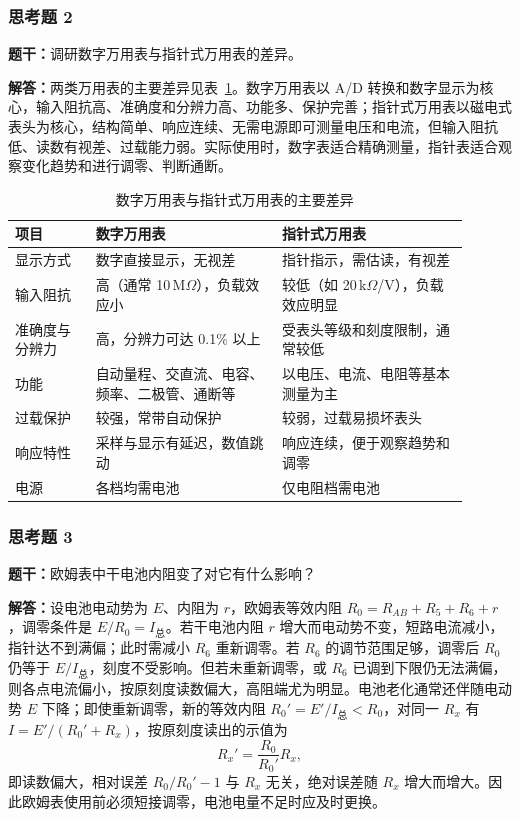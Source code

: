 \documentclass{Phyport}
\begin{document}
\subsubsection{思考题 2}
\textbf{题干：}调研数字万用表与指针式万用表的差异。

\textbf{解答：}两类万用表的主要差异见表~\ref{tab:dmm}。数字万用表以 A/D 转换和数字显示为核心，输入阻抗高、准确度和分辨力高、功能多、保护完善；指针式万用表以磁电式表头为核心，结构简单、响应连续、无需电源即可测量电压和电流，但输入阻抗低、读数有视差、过载能力弱。实际使用时，数字表适合精确测量，指针表适合观察变化趋势和进行调零、判断通断。

\begin{table}[H]
    \centering
    \caption{数字万用表与指针式万用表的主要差异}
    \label{tab:dmm}
    \small
    \begin{tabular}{p{0.16\linewidth}p{0.37\linewidth}p{0.37\linewidth}}
        \toprule
        项目 & 数字万用表 & 指针式万用表 \\
        \midrule
        显示方式 & 数字直接显示，无视差 & 指针指示，需估读，有视差 \\
        输入阻抗 & 高（通常 10\,M$\Omega$），负载效应小 & 较低（如 20\,k$\Omega$/V），负载效应明显 \\
        准确度与分辨力 & 高，分辨力可达 0.1\% 以上 & 受表头等级和刻度限制，通常较低 \\
        功能 & 自动量程、交直流、电容、频率、二极管、通断等 & 以电压、电流、电阻等基本测量为主 \\
        过载保护 & 较强，常带自动保护 & 较弱，过载易损坏表头 \\
        响应特性 & 采样与显示有延迟，数值跳动 & 响应连续，便于观察趋势和调零 \\
        电源 & 各档均需电池 & 仅电阻档需电池 \\
        \bottomrule
    \end{tabular}
\end{table}

\subsubsection{思考题 3}
\textbf{题干：}欧姆表中干电池内阻变了对它有什么影响？

\textbf{解答：}设电池电动势为 $E$、内阻为 $r$，欧姆表等效内阻 $R_0=R_{AB}+R_5+R_6+r$，调零条件是 $E/R_0=I_{\text{总}}$。若干电池内阻 $r$ 增大而电动势不变，短路电流减小，指针达不到满偏；此时需减小 $R_6$ 重新调零。若 $R_6$ 的调节范围足够，调零后 $R_0$ 仍等于 $E/I_{\text{总}}$，刻度不受影响。但若未重新调零，或 $R_6$ 已调到下限仍无法满偏，则各点电流偏小，按原刻度读数偏大，高阻端尤为明显。电池老化通常还伴随电动势 $E$ 下降；即使重新调零，新的等效内阻 $R_0'=E'/I_{\text{总}}<R_0$，对同一 $R_x$ 有 $I=E'/(R_0'+R_x)$，按原刻度读出的示值为
\begin{equation}
    R_x'=\frac{R_0}{R_0'}R_x,
\end{equation}
即读数偏大，相对误差 $R_0/R_0'-1$ 与 $R_x$ 无关，绝对误差随 $R_x$ 增大而增大。因此欧姆表使用前必须短接调零，电池电量不足时应及时更换。


\end{document}
